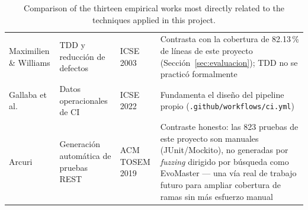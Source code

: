 \begin{table}[H]
\begin{tabular}{p{2.6cm}p{2cm}p{1.8cm}p{6.2cm}}
Maximilien \& Williams \cite{maximilien2003} & TDD y reducción de defectos & ICSE 2003 & Contrasta con la cobertura de 82.13\,\% de líneas de este proyecto (Sección~\ref{sec:evaluacion}); TDD no se practicó formalmente \\
Gallaba et al. \cite{gallaba2022} & Datos operacionales de CI & ICSE 2022 & Fundamenta el diseño del pipeline propio (\texttt{.github/workflows/ci.yml}) \\
Arcuri \cite{arcuri2019} & Generación automática de pruebas REST & ACM TOSEM 2019 & Contraste honesto: las 823 pruebas de este proyecto son manuales (JUnit/Mockito), no generadas por \textit{fuzzing} dirigido por búsqueda como EvoMaster --- una vía real de trabajo futuro para ampliar cobertura de ramas sin más esfuerzo manual \\
\bottomrule
\end{tabular}
\caption{Comparison of the thirteen empirical works most directly related to the techniques applied
in this project.}
\label{tab:trabajos-relacionados}
\end{table}
\newpage
